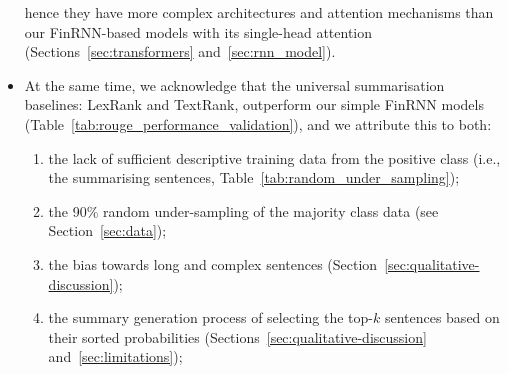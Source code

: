 \begin{itemize}
    hence they have more complex architectures and attention mechanisms than our FinRNN-based models with its single-head attention (Sections~\ref{sec:transformers} and~\ref{sec:rnn_model}).
    \item At the same time, we acknowledge that the universal summarisation baselines: LexRank and TextRank, outperform
        our simple FinRNN models (Table~\ref{tab:rouge_performance_validation}), and we attribute this to both:
    \begin{enumerate}%
        \item the lack of sufficient descriptive training data from the positive class (i.e., the summarising sentences, Table~\ref{tab:random_under_sampling});
        \item the 90\% random under-sampling of the majority class data (see Section~\ref{sec:data});
        \item the bias towards long and complex sentences (Section~\ref{sec:qualitative-discussion});
        \item the summary generation process of selecting the top-$k$ sentences based on their sorted probabilities (Sections~\ref{sec:qualitative-discussion} and~\ref{sec:limitations});
    \end{enumerate}
\end{itemize}

\newpage

